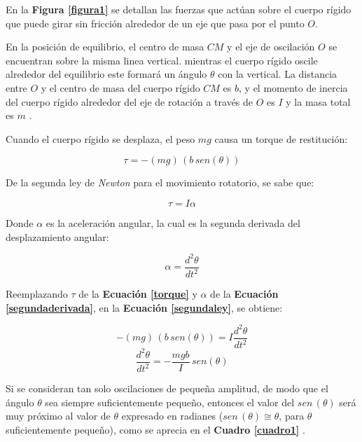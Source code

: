 \documentclass[letter,11pt]{article}
\begin{document}
En la \textbf{Figura \ref{figura1}} se detallan las fuerzas que actúan sobre el
cuerpo rígido que puede girar sin fricción alrededor de un eje que pasa por el
punto $O$.

En la posición de equilibrio, el centro de masa $CM$ y el eje de oscilación $O$
se encuentran sobre la misma linea vertical. mientras el cuerpo rígido oscile
alrededor del equilibrio este formará un ángulo $\theta$ con la vertical. La
distancia entre $O$ y el centro de masa del cuerpo rígido $CM$ es $b$, y el
momento de inercia del cuerpo rígido alrededor del eje de rotación a través de
$O$ es $I$ y la masa total es $m$ \cite{Young&Freedman}.

Cuando el cuerpo rígido se desplaza, el peso $mg$ causa un torque de
restitución:

\begin{equation}
    \tau = -(mg)\,(b\, sen(\theta))
\label{torque}
\end{equation}
\vspace{0.10cm}

De la segunda ley de \emph{Newton} para el movimiento rotatorio, se sabe que:

\begin{equation}
    \tau = I \alpha
\label{segundaley}
\end{equation}
\vspace{0.10cm}

Donde $\alpha$ es la aceleración angular, la cual es la segunda derivada del
desplazamiento angular:

\begin{equation}
    \alpha = \frac{d^2\theta}{dt^2}
\label{segundaderivada}
\end{equation}
\vspace{0.10cm}

Reemplazando $\tau$ de la \textbf{Ecuación \ref{torque}} y $\alpha$  de la
\textbf{Ecuación \ref{segundaderivada}}, en la
\textbf{Ecuación \ref{segundaley}}, se obtiene:

\begin{equation*}
    -(mg)\,(b\, sen(\theta)) = I \frac{d^2\theta}{dt^2}
\end{equation*}
\begin{equation}
    \frac{d^2\theta}{dt^2} = - \frac{mgb}{I}\, sen(\theta)
\label{diferencial}
\end{equation}
\vspace{0.10cm}

Si se consideran tan solo oscilaciones de pequeña amplitud, de modo que el
ángulo $\theta$ sea siempre suficientemente pequeño, entonces el valor del
$sen\, (\theta)$ será muy próximo al valor de $\theta$ expresado en radianes
($sen\, (\theta) \cong \theta$, para $\theta$ suficientemente pequeño), como
se aprecia en el \textbf{Cuadro \ref{cuadro1}} \cite{WIKI1}.
\end{document}
